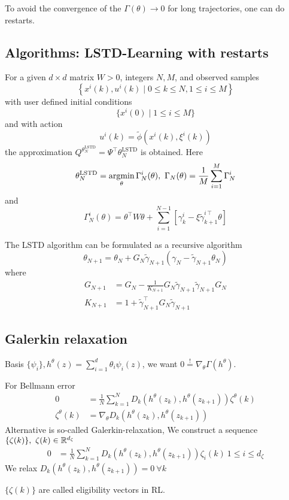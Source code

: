 To avoid the convergence of the \(\Gamma(\theta)\to 0\) for long trajectories,
one can do restarts.

\subsection{Algorithms: LSTD-Learning with restarts}
For a given \(d\times d\) matrix \(W>0\), integers \(N,M\), and 
observed samples \[\left\{x^i(k),u^i(k)\mid 0\leq k\leq N,1\leq i\leq M\right\}\]
with user defined initial conditions \[\{x^i(0)\mid 1\leq i\leq M\}\]
and with action  \[u^i(k)=\tilde{\phi}(x^i(k),\xi^i(k))\]
the approximation \(Q^{\theta_N^{\text{LSTD}}}=\Psi^\intercal\theta_N^{\text{LSTD}}\)
is obtained. Here 
\[\theta_N^\text{LSTD}=\argmin_\theta \Gamma_N^i(\theta),\ \Gamma_N(\theta)=\frac{1}{M}\sum_{i=1}^M\Gamma_N^i\]
and 
\[\Gamma_N^i(\theta)=\theta^\intercal W \theta +\sum_{i=1}^{N-1}\left[\gamma_k^i-\xi\tilde{\gamma}_{k+1}^{i\intercal} \theta\right]\] %

\begin{remark} %
    The LSTD algorithm can be formulated as a recursive algorithm 
    \[\theta_{N+1}=\theta_N+G_N\tilde{\gamma}_{N+1}(\gamma_N-\tilde{\gamma}_{N+1}\theta_N)\]
    where \begin{align*}
        G_{N+1}&=G_N-\frac{1}{K_{N+1}}G_N\tilde{\gamma}_{N+1}\tilde{\gamma}_{N+1}G_N\\
        K_{N+1}&=1+\tilde{\gamma}_{N+1}^\intercal G_N \tilde{\gamma}_{N+1}
    \end{align*}
\end{remark}

\subsection{Galerkin relaxation}

Basis \(\{\psi_i\},h^\theta(z)=\sum_{i=1}^d \theta_i\psi_i(z)\), we want \(0\stackrel{!}{=}\nabla_\theta \Gamma(h^\theta)\).

For Bellmann error 
\begin{align*}
    0&=\frac{1}{N}\sum_{k=1}^ND_k(h^\theta(z_k),h^\theta(z_{k+1}))\zeta^\theta(k)\\
    \zeta^\theta(k)&=\nabla_\theta D_k(h^\theta(z_k),h^\theta(z_{k+1}))
\end{align*}
Alternative is so-called Galerkin-relaxation, We construct a sequence \(\{\zeta(k)\},\ \zeta(k)\in \mathbb{R}^{d_\zeta}\)
\begin{align*}
    0&=\frac{1}{N}\sum_{k=1}^ND_{k}(h^\theta(z_k),h^\theta(z_{k+1}))\zeta_i(k)\ 1\leq i\leq d_\zeta
\end{align*}
We relax \(D_k(h^{\theta}(z_k),h^\theta(z_{k+1}))=0\ \forall k\)
\begin{center}
    \(\{\zeta(k)\}\) are called eligibility vectors in RL. 
\end{center}

